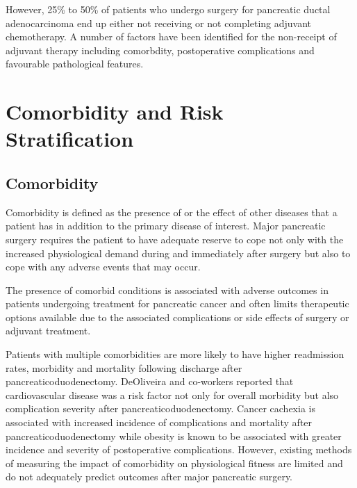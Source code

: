 However, 25\% to 50\% of patients who undergo surgery for pancreatic ductal adenocarcinoma end up either not receiving or not completing adjuvant chemotherapy. \parencite{sohn_resected_2000, neoptolemos_randomized_2004, oettle_adjuvant_2007} A number of factors have been identified for the non-receipt of adjuvant therapy including comorbdity, postoperative complications and favourable pathological features.\parencite{spitz_preoperative_1997, aloia_delayed_2007, oettle_adjuvant_2007, merchant_adjuvant_2009, russ_impact_2009}

\section{Comorbidity and Risk Stratification}
\label{sec:comorbidity_risk_stratification}
\subsection{Comorbidity}
Comorbidity is defined as the presence of or the effect of other diseases that a patient has in addition to the primary disease of interest. Major pancreatic surgery requires the patient to have adequate reserve to cope not only with the increased physiological demand during and immediately after surgery but also to cope with any adverse events that may occur.

The presence of comorbid conditions is associated with adverse outcomes in patients undergoing treatment for pancreatic cancer\parencite{mann_review_2010} and often limits therapeutic options available due to the associated complications or side effects of surgery or adjuvant treatment. \parencite{sandroussi_sociodemographics_2010}

Patients with multiple comorbidities are more likely to have higher readmission rates, morbidity and mortality following discharge after pancreaticoduodenectomy.\parencite{schneider_patient_2012} DeOliveira and co-workers reported that cardiovascular disease was a risk factor not only for overall morbidity but also complication severity after pancreaticoduodenectomy.\parencite{deoliveira_assessment_2006} Cancer cachexia is associated with increased incidence of complications and mortality after pancreaticoduodenectomy\parencite{pausch_cachexia_2012} while obesity is known to be associated with greater incidence and severity of postoperative complications.\parencite{benns_impact_2009} However, existing methods of measuring the impact of comorbidity on physiological fitness are limited and do not adequately predict outcomes after major pancreatic surgery. \parencite{shah_limitations_2012}

